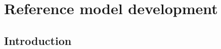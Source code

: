 %

\chapter{Reference model development}
\label{chap1}
\graphicspath{ {./chapters/chap1images/} }
\section{Introduction}

